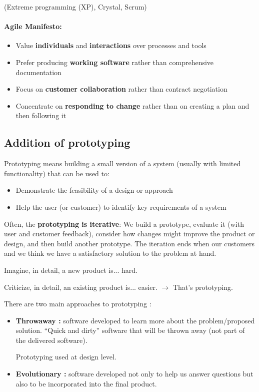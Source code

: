 (Extreme programming (XP), Crystal, Scrum)


\paragraph{Agile Manifesto:}

\begin{itemize}
    \item Value \textbf{individuals} and \textbf{interactions} over processes and tools
    \item Prefer producing \textbf{working software} rather than comprehensive documentation
    \item Focus on \textbf{customer collaboration} rather than contract negotiation
    \item Concentrate on \textbf{responding to change} rather than on creating a plan and then following it
\end{itemize}


\subsection{Addition of prototyping}

Prototyping means building a small version of a system (usually with limited
functionality) that can be used to:

\begin{itemize}
    \item Demonstrate the feasibility of a design or approach
    \item Help the user (or customer) to identify key requirements of a system
\end{itemize}


Often, the \textbf{prototyping is iterative}: We build a prototype, evaluate it (with
user and customer feedback), consider how changes might improve the product or
design, and then build another prototype. The iteration ends when our customers
and we think we have a satisfactory solution to the problem at hand.

\begin{center}
Imagine, in detail, a new product is... hard.


Criticize, in detail, an existing product is... easier.
 $\rightarrow$ That's prototyping.
 \end{center}


There are two main approaches to prototyping :

\begin{itemize}
    \item \textbf{Throwaway :} software developed to learn more about the
    problem/proposed solution. “Quick and dirty” software that will be thrown
    away (not part of the delivered software).

    Prototyping used at design level.

    \item \textbf{Evolutionary :} software developed not only to help us answer questions
    but also to be incorporated into the final product.
\end{itemize}

